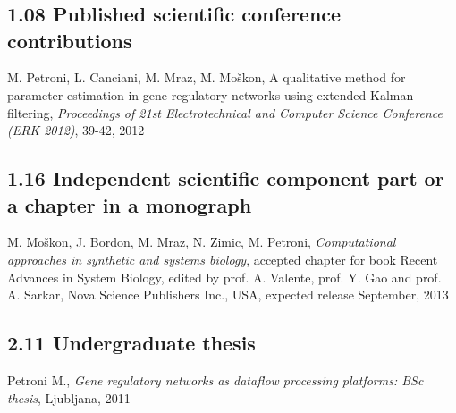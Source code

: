 \graphicspath{{img/}}










\appendix
\section{\bibliographyname}
%
%

\subsection*{1.08 Published scientific conference contributions}
\begin{bib}
\item M. Petroni, L. Canciani, M. Mraz, M. Mo\v{s}kon, A qualitative method for parameter estimation in gene regulatory networks using extended Kalman filtering, \emph{Proceedings of 21st Electrotechnical and Computer Science Conference (ERK 2012)}, 39-42, 2012
\end{bib}

\subsection*{1.16 Independent scientific component part or a chapter in a monograph}
\begin{bib}[resume]
\item M. Mo\v{s}kon, J. Bordon, M. Mraz, N. Zimic, M. Petroni, \emph{Computational approaches in synthetic and systems biology}, accepted chapter for book Recent Advances in System Biology, edited by prof. A. Valente, prof. Y. Gao and prof. A. Sarkar, Nova Science Publishers Inc., USA, expected release September, 2013
\end{bib}

\subsection*{2.11 Undergraduate thesis}
\begin{bib}[resume]
\item Petroni M., \textit{Gene regulatory networks as dataflow processing platforms: BSc thesis}, Ljubljana, 2011
\end{bib}

